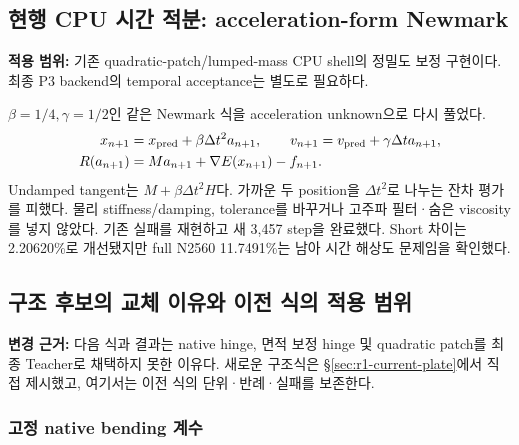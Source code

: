 \documentclass[10pt]{article}
\begin{document}
\subsection{현행 CPU 시간 적분: acceleration-form Newmark}
\label{sec:r1-current-integrator}

\textbf{적용 범위:} 기존 quadratic-patch/lumped-mass CPU shell의 정밀도 보정 구현이다.
최종 P3 backend의 temporal acceptance는 별도로 필요하다.

\(\beta=1/4,\gamma=1/2\)인 같은 Newmark 식을 acceleration unknown으로 다시 풀었다.
\begin{equation}
\begin{aligned}
 x_{n+1}&=x_{\rm pred}+\beta\Delta t^2a_{n+1},\qquad
 v_{n+1}=v_{\rm pred}+\gamma\Delta t a_{n+1},\\
 R(a_{n+1})&=Ma_{n+1}+\nabla E(x_{n+1})-f_{n+1}.
\end{aligned}
\label{eq:r1-acceleration-newmark}
\end{equation}
Undamped tangent는 \(M+\beta\Delta t^2H\)다. 가까운 두 position을
\(\Delta t^2\)로 나누는 잔차 평가를 피했다. 물리 stiffness/damping, tolerance를 바꾸거나
고주파 필터·숨은 viscosity를 넣지 않았다. 기존 실패를 재현하고 새 3,457 step을 완료했다.
Short 차이는 2.20620\%로 개선됐지만 full N2560 11.7491\%는 남아 시간 해상도 문제임을 확인했다.



\subsection{구조 후보의 교체 이유와 이전 식의 적용 범위}
\label{sec:r1-rejected-structures}

\textbf{변경 근거:} 다음 식과 결과는 native hinge, 면적 보정 hinge 및 quadratic patch를
최종 Teacher로 채택하지 못한 이유다. 새로운 구조식은
\S\ref{sec:r1-current-plate}에서 직접 제시했고, 여기서는 이전 식의 단위·반례·실패를 보존한다.

\subsubsection{고정 native bending 계수}
\end{document}
